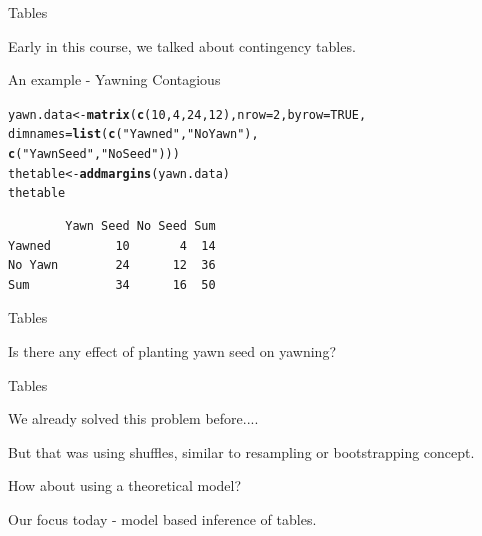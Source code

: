 \documentclass{beamer}\usepackage[]{graphicx}\usepackage[]{color}
\makeatletter
\newcommand{\hlnum}[1]{\textcolor[rgb]{0.2,0.2,0.2}{#1}}%
\newcommand{\hlstr}[1]{\textcolor[rgb]{0.2,0.2,0.2}{#1}}%
\newcommand{\hlstd}[1]{\textcolor[rgb]{0.102,0.102,0.102}{#1}}%
\newcommand{\hlkwb}[1]{\textcolor[rgb]{0.102,0.102,0.102}{#1}}%
\newcommand{\hlkwc}[1]{\textcolor[rgb]{0.2,0.2,0.2}{#1}}%
\newcommand{\hlkwd}[1]{\textcolor[rgb]{0.102,0.102,0.102}{\textbf{#1}}}%
\newenvironment{kframe}{%
 \def\at@end@of@kframe{}%
 \ifinner\ifhmode%
  \def\at@end@of@kframe{\end{minipage}}%
  \begin{minipage}{\columnwidth}%
 \fi\fi%
 \def\FrameCommand##1{\hskip\@totalleftmargin \hskip-\fboxsep
 \colorbox{shadecolor}{##1}\hskip-\fboxsep
     \hskip-\linewidth \hskip-\@totalleftmargin \hskip\columnwidth}%
 \MakeFramed {\advance\hsize-\width
   \@totalleftmargin\z@ \linewidth\hsize
   \@setminipage}}%
 {\par\unskip\endMakeFramed%
 \at@end@of@kframe}
\newenvironment{knitrout}{}{} %
\renewenvironment{knitrout}{\begin{spacing}{0.75}\begin{tiny}}{\end{tiny}\end{spacing}}
\makeatother
\begin{document}
\begin{frame}[fragile]{Tables}

Early in this course, we talked about contingency tables. \pause  \newline

An example -  Yawning Contagious \pause


\begin{knitrout}\small
{}\color{fgcolor}\begin{kframe}
\begin{alltt}
\hlstd{yawn.data} \hlkwb{<-} \hlkwd{matrix}\hlstd{(}\hlkwd{c}\hlstd{(}\hlnum{10}\hlstd{,}\hlnum{4}\hlstd{,}\hlnum{24}\hlstd{,}\hlnum{12}\hlstd{),} \hlkwc{nrow}\hlstd{=}\hlnum{2}\hlstd{,} \hlkwc{byrow}\hlstd{=}\hlnum{TRUE}\hlstd{,}
                \hlkwc{dimnames} \hlstd{=} \hlkwd{list}\hlstd{(}\hlkwd{c}\hlstd{(}\hlstr{"Yawned"}\hlstd{,} \hlstr{"No Yawn"}\hlstd{),}
                                \hlkwd{c}\hlstd{(}\hlstr{"Yawn Seed"}\hlstd{,} \hlstr{"No Seed"}\hlstd{)))}
\hlstd{thetable} \hlkwb{<-}  \hlkwd{addmargins}\hlstd{(yawn.data)}
\hlstd{thetable}
\end{alltt}
\begin{verbatim}
        Yawn Seed No Seed Sum
Yawned         10       4  14
No Yawn        24      12  36
Sum            34      16  50
\end{verbatim}
\end{kframe}
\end{knitrout}

\end{frame}

\begin{frame}[fragile]{Tables}

\centering \Huge{Is there any effect of planting yawn seed on yawning?}

\end{frame}

\begin{frame}[fragile]{Tables}

We already solved this problem before.... \pause \newline

But that was using shuffles, similar to resampling or bootstrapping concept. \pause \newline

How about using a theoretical model? \pause \newline

Our focus today - model based inference of tables.

\end{frame}
\end{document}
